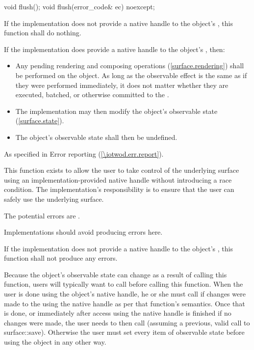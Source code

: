 \begin{itemdecl}
void flush();
void flush(error_code& ec) noexcept;
\end{itemdecl}
\begin{itemdescr}
\pnum
\effects
If the implementation does not provide a native handle to the  object's \underlyingsurface, this function shall do nothing.

\pnum
If the implementation does provide a native handle to the  object's \underlyingsurface, then:
\begin{itemize}
	\item Any pending rendering and composing operations (\ref{surface.rendering}) shall be performed on the  object.
	\enternote
	As long as the observable effect is the same as if they were performed immediately, it does not matter whether they are executed, batched, or otherwise committed to the \underlyingrendandpresenttechs.
	\exitnote
	\item The implementation may then modify the  object's observable state (\ref{surface.state}). 
	\item The  object's observable state shall then be undefined.
\end{itemize}

\pnum
\throws
As specified in Error reporting (\ref{\iotwod.err.report}).

\pnum
\remarks
This function exists to allow the user to take control of the underlying surface using an implementation-provided native handle without introducing a race condition. The implementation's responsibility is to ensure that the user can safely use the underlying surface.

\pnum
\errors
The potential errors are .

\pnum
Implementations should avoid producing errors here.

\pnum
If the implementation does not provide a native handle to the  object's \underlyingsurface, this function shall not produce any errors.

\pnum
\realnotes
Because the  object's observable state can change as a result of calling this function, users will typically want to call  before calling this function. When the user is done using the  object's native handle, he or she must call  if changes were made to the \underlyingsurface using the native handle as per that function's semantics. Once that is done, or immediately after access using the native handle is finished if no changes were made, the user needs to then call  (assuming a previous, valid call to {surface::save}). Otherwise the user must set every item of observable state before using the  object in any other way.
\end{itemdescr}


